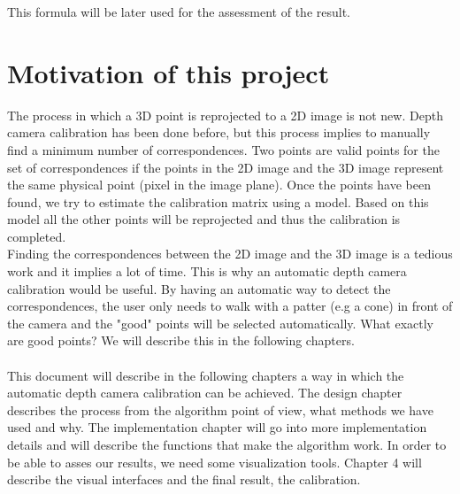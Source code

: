 \noindent
This formula will be later used for the assessment of the result.

\section{Motivation of this project}
\noindent
The process in which a 3D point is reprojected to a 2D image is not new. Depth camera calibration has been done before, but this process implies to manually find a minimum number of correspondences. Two points are valid points for the set of correspondences if the points in the 2D image and the 3D image represent the same physical point (pixel in the image plane). Once the points have been found, we try to estimate the calibration matrix using a model. Based on this model all the other points will be reprojected and thus the calibration is completed.  
\\
\noindent
Finding the correspondences between the 2D image and the 3D image is a tedious work and it implies a lot of time. This is why an automatic depth camera calibration would be useful. By having an automatic way to detect the correspondences, the user only needs to walk with a patter (e.g a cone) in front of the camera and the "good" points will be selected automatically. What exactly are good points? We will describe this in the following chapters. 
\\\\
\noindent
This document will describe in the following chapters a way in which the automatic depth camera calibration can be achieved. The design chapter describes the process from the algorithm point of view, what methods we have used and why. The implementation chapter will go into more implementation details and will describe the functions that make the algorithm work. In order to be able to asses our results, we need some visualization tools. Chapter 4 will describe the visual interfaces and the final result, the calibration.    
